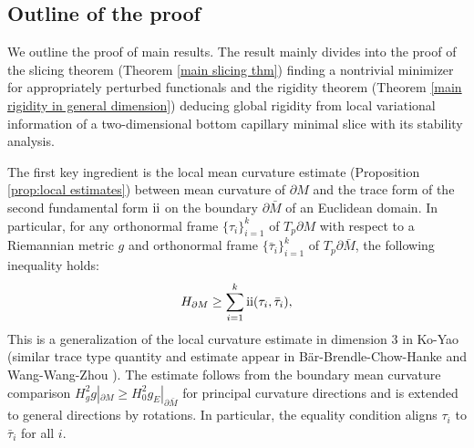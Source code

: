 \documentclass[11pt,letterpaper]{amsart}
\newcommand{\RN}[1]{%
  \textup{\uppercase\expandafter{\romannumeral#1}}%
}
\begin{document}
\subsection{Outline of the proof} We outline the proof of main results. The result mainly divides into the proof of the slicing theorem (Theorem \ref{main slicing thm}) finding a nontrivial minimizer for appropriately perturbed functionals and the rigidity theorem (Theorem \ref{main rigidity in general dimension}) deducing global rigidity from local variational information of a two-dimensional bottom capillary minimal slice with its stability analysis.

The first key ingredient is the local mean curvature estimate (Proposition \ref{prop:local estimates}) between mean curvature of $\partial M$ and the trace form of the second fundamental form $\RN{2}$ on the boundary $\partial \bar{M}$ of an Euclidean domain. In particular, for any orthonormal frame $\{\tau_i\}_{i=1}^k$ of $T_p \partial M$ with respect to a Riemannian metric $g$ and orthonormal frame $\{\bar{\tau}_i\}_{i=1}^k$ of $T_p \partial \bar{M}$, the following inequality holds:
\begin{align}\label{eq: local estimate intro}
    H_{\partial M}\geq \sum_{i=1}^k\RN{2}(\tau_i,\bar{\tau}_i),
\end{align}
This is a generalization of the local curvature estimate in dimension $3$ in Ko-Yao \cite{koyao} (similar trace type quantity and estimate appear in Bär-Brendle-Chow-Hanke \cite{bar2023rigidity} and Wang-Wang-Zhou \cite{wang2024scalar}). The estimate follows from the boundary mean curvature comparison $H_g^2g|_{\partial M}\geq H_0^2g_{E}|_{\partial \bar{M}}$ for principal curvature directions and is extended to general directions by rotations. In particular, the equality condition aligns $\tau_{i}$ to $\bar{\tau}_{i}$ for all $i$.
\end{document}
